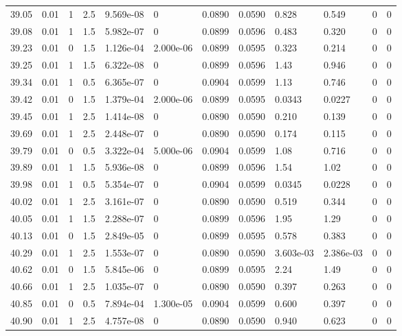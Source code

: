 \documentclass[preview]{standalone}
\begin{document}
{{{{{{{{\begin{tabular}{L{1.2cm}C{1.2cm} C{0.3cm}C{0.5cm} C{1.4cm}C{1.4cm} C{1.4cm}C{1.4cm} C{1.6cm}C{1.6cm} C{1.6cm}C{1.6cm}}
  39.05  &  0.01  & 1     & 2.5 &  9.569e-08  & 0  &  0.0890&   0.0590& 0.828 & 0.549   &  0 & 0  \\ 
  39.08  &  0.01  & 1     & 1.5 &  5.982e-07  & 0  &  0.0899&   0.0596& 0.483 & 0.320   &  0 & 0  \\ 
  39.23  &  0.01  & 0     & 1.5 &  1.126e-04  & 2.000e-06  &  0.0899&   0.0595& 0.323 & 0.214   &  0 & 0  \\ 
  39.25  &  0.01  & 1     & 1.5 &  6.322e-08  & 0  &  0.0899&   0.0596& 1.43 & 0.946   &  0 & 0  \\ 
  39.34  &  0.01  & 1     & 0.5 &  6.365e-07  & 0  &  0.0904&   0.0599& 1.13 & 0.746   &  0 & 0  \\ 
  39.42  &  0.01  & 0     & 1.5 &  1.379e-04  & 2.000e-06  &  0.0899&   0.0595& 0.0343 & 0.0227   &  0 & 0  \\ 
  39.45  &  0.01  & 1     & 2.5 &  1.414e-08  & 0  &  0.0890&   0.0590& 0.210 & 0.139   &  0 & 0  \\ 
  39.69  &  0.01  & 1     & 2.5 &  2.448e-07  & 0  &  0.0890&   0.0590& 0.174 & 0.115   &  0 & 0  \\ 
  39.79  &  0.01  & 0     & 0.5 &  3.322e-04  & 5.000e-06  &  0.0904&   0.0599& 1.08 & 0.716   &  0 & 0  \\ 
  39.89  &  0.01  & 1     & 1.5 &  5.936e-08  & 0  &  0.0899&   0.0596& 1.54 & 1.02   &  0 & 0  \\ 
  39.98  &  0.01  & 1     & 0.5 &  5.354e-07  & 0  &  0.0904&   0.0599& 0.0345 & 0.0228   &  0 & 0  \\ 
  40.02  &  0.01  & 1     & 2.5 &  3.161e-07  & 0  &  0.0890&   0.0590& 0.519 & 0.344   &  0 & 0  \\ 
  40.05  &  0.01  & 1     & 1.5 &  2.288e-07  & 0  &  0.0899&   0.0596& 1.95 & 1.29   &  0 & 0  \\ 
  40.13  &  0.01  & 0     & 1.5 &  2.849e-05  & 0  &  0.0899&   0.0595& 0.578 & 0.383   &  0 & 0  \\ 
  40.29  &  0.01  & 1     & 2.5 &  1.553e-07  & 0  &  0.0890&   0.0590& 3.603e-03 & 2.386e-03   &  0 & 0  \\ 
  40.62  &  0.01  & 0     & 1.5 &  5.845e-06  & 0  &  0.0899&   0.0595& 2.24 & 1.49   &  0 & 0  \\ 
  40.66  &  0.01  & 1     & 2.5 &  1.035e-07  & 0  &  0.0890&   0.0590& 0.397 & 0.263   &  0 & 0  \\ 
  40.85  &  0.01  & 0     & 0.5 &  7.894e-04  & 1.300e-05  &  0.0904&   0.0599& 0.600 & 0.397   &  0 & 0  \\ 
  40.90  &  0.01  & 1     & 2.5 &  4.757e-08  & 0  &  0.0890&   0.0590& 0.940 & 0.623   &  0 & 0  \\ 

\end{tabular}}}}}}}}}
\end{document}
